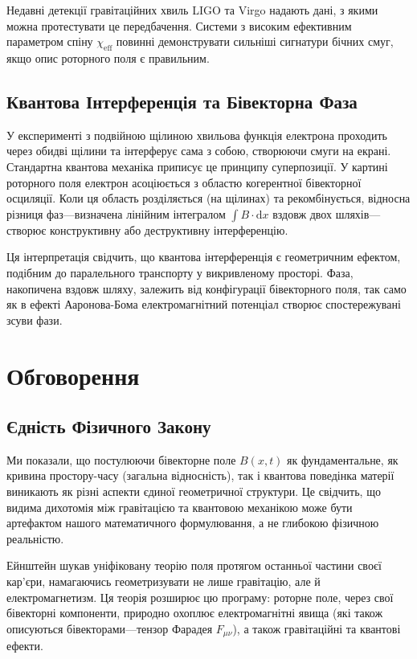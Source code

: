 \documentclass[11pt,a4paper]{article}
\numberwithin{equation}{section}
\theoremstyle{plain}
\theoremstyle{definition}
\theoremstyle{remark}
\newcommand{\dd}{\mathrm{d}}
\begin{document}
Недавні детекції гравітаційних хвиль LIGO та Virgo надають дані, з якими можна протестувати це передбачення. Системи з високим ефективним параметром спіну $\chi_{\mathrm{eff}}$ повинні демонструвати сильніші сигнатури бічних смуг, якщо опис роторного поля є правильним.

\subsection{Квантова Інтерференція та Бівекторна Фаза}

У експерименті з подвійною щілиною хвильова функція електрона проходить через обидві щілини та інтерферує сама з собою, створюючи смуги на екрані. Стандартна квантова механіка приписує це принципу суперпозиції. У картині роторного поля електрон асоціюється з областю когерентної бівекторної осциляції. Коли ця область розділяється (на щілинах) та рекомбінується, відносна різниця фаз---визначена лінійним інтегралом $\int B \cdot \dd x$ вздовж двох шляхів---створює конструктивну або деструктивну інтерференцію.

Ця інтерпретація свідчить, що квантова інтерференція є геометричним ефектом, подібним до паралельного транспорту у викривленому просторі. Фаза, накопичена вздовж шляху, залежить від конфігурації бівекторного поля, так само як в ефекті Ааронова-Бома електромагнітний потенціал створює спостережувані зсуви фази.

\section{Обговорення}
\label{sec:discussion}

\subsection{Єдність Фізичного Закону}

Ми показали, що постулюючи бівекторне поле $B(x,t)$ як фундаментальне, як кривина простору-часу (загальна відносність), так і квантова поведінка матерії виникають як різні аспекти єдиної геометричної структури. Це свідчить, що видима дихотомія між гравітацією та квантовою механікою може бути артефактом нашого математичного формулювання, а не глибокою фізичною реальністю.

Ейнштейн шукав уніфіковану теорію поля протягом останньої частини своєї кар'єри, намагаючись геометризувати не лише гравітацію, але й електромагнетизм. Ця теорія розширює цю програму: роторне поле, через свої бівекторні компоненти, природно охоплює електромагнітні явища (які також описуються бівекторами---тензор Фарадея $F_{\mu\nu}$), а також гравітаційні та квантові ефекти.
\end{document}

